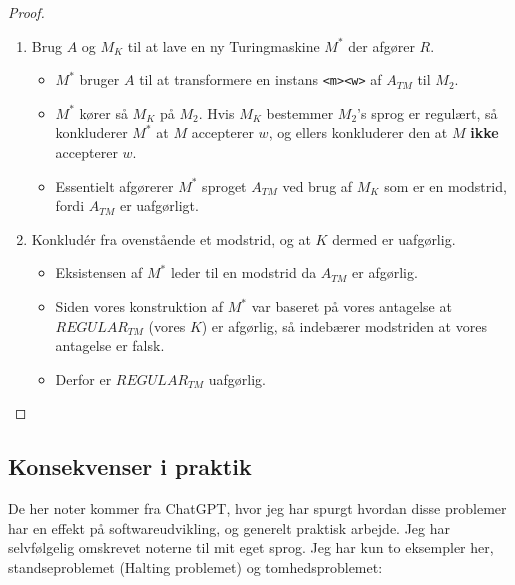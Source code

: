 \begin{proof}
\begin{enumerate}
		\item Brug $A$ og $M_{K}$ til at lave en ny Turingmaskine $M^{*}$ der afgører $R$.
		      \begin{itemize}
			      \item $M^{*}$ bruger $A$ til at transformere en instans \texttt{<m><w>} af $A_{TM}$ til $M_{2}$.
			      \item $M^{*}$ kører så $M_{K}$ på $M_{2}$. Hvis $M_{K}$ bestemmer $M_{2}$'s sprog er regulært, så konkluderer $M^{*}$ at $M$ accepterer $w$, og ellers konkluderer den at $M$ \textbf{ikke} accepterer $w$.
			      \item Essentielt afgørerer $M^{*}$ sproget $A_{TM}$ ved brug af $M_{K}$ som er en modstrid, fordi $A_{TM}$ er uafgørligt.
		      \end{itemize}
		\item Konkludér fra ovenstående et modstrid, og at $K$ dermed er uafgørlig.
		      \begin{itemize}
			      \item Eksistensen af $M^{*}$ leder til en modstrid da $A_{TM}$ er afgørlig.
			      \item Siden vores konstruktion af $M^{*}$ var baseret på vores antagelse at $REGULAR_{TM}$ (vores $K$) er afgørlig, så indebærer modstriden at vores antagelse er falsk.
			      \item Derfor er $REGULAR_{TM}$ uafgørlig.
		      \end{itemize}
	\end{enumerate}


\end{proof}

\subsection{Konsekvenser i praktik}%
\label{subsec:uafgørlighedpraktik}

De her noter kommer fra ChatGPT, hvor jeg har spurgt hvordan disse problemer har en effekt på softwareudvikling, og generelt praktisk arbejde. Jeg har selvfølgelig omskrevet noterne til mit eget sprog. Jeg har kun to eksempler her, standseproblemet (Halting problemet) og tomhedsproblemet:


